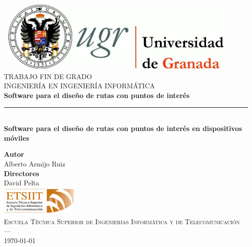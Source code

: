 \begin{titlepage}
\newlength{\centeroffset}
\setlength{\centeroffset}{-0.5\oddsidemargin}
\addtolength{\centeroffset}{0.5\evensidemargin}
\thispagestyle{empty}

\noindent\hspace*{\centeroffset}\begin{minipage}{\textwidth}

\centering
\includegraphics[width=0.9\textwidth]{imagenes/logo_ugr.jpg}\\[1.4cm]

\textsc{ \Large TRABAJO FIN DE GRADO\\[0.2cm]}
\textsc{ INGENIERÍA EN INGENIERÍA INFORMÁTICA}\\[1cm]
% 
{\Huge\bfseries Software para el diseño de rutas con 
	puntos de interés\\
}
\noindent\rule[-1ex]{\textwidth}{3pt}\\[3.5ex]
{\large\bfseries Software para el diseño de rutas con 
	puntos de interés en dispositivos móviles}
\end{minipage}

\vspace{1cm}
\noindent\hspace*{\centeroffset}\begin{minipage}{\textwidth}
\centering

\textbf{Autor}\\ {Alberto Armijo Ruiz}\\[2.5ex]
\textbf{Directores}\\
{David Pelta}\\[2cm]
\includegraphics[width=0.3\textwidth]{imagenes/etsiit_logo.png}\\[0.1cm]
\textsc{Escuela Técnica Superior de Ingenierías Informática y de Telecomunicación}\\
\textsc{---}\\
\today
\end{minipage}
\end{titlepage}



